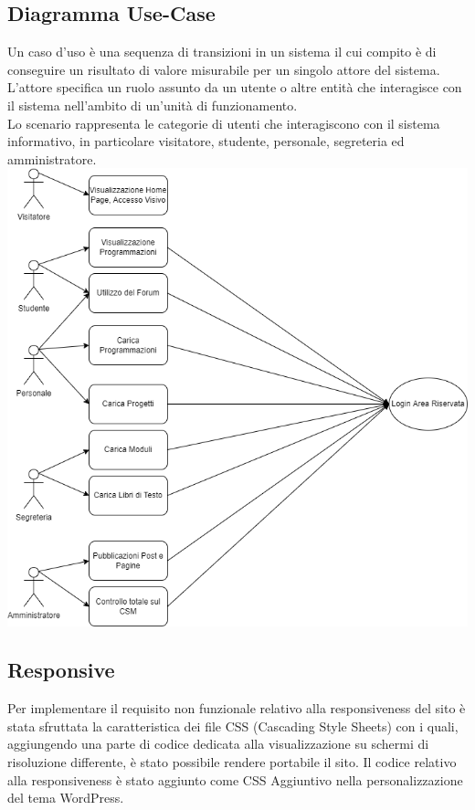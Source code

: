 \documentclass{article}
\begin{document}
	\subsection{\textbf{Diagramma Use-Case}}

	Un caso d’uso è una sequenza di transizioni in un sistema il cui compito è di conseguire un risultato di valore misurabile per un singolo attore del sistema.\\
    L’attore specifica un ruolo assunto da un utente o altre entità che interagisce con il sistema nell’ambito di un’unità di funzionamento.\\
    Lo scenario rappresenta le categorie di utenti che interagiscono con il sistema informativo, in particolare visitatore, studente, personale, segreteria ed amministratore.\\
	\includegraphics[scale=0.4]{usecase.drawio.png}\\
		
	\subsection{\textbf{Responsive}}

	Per implementare il requisito non funzionale relativo alla responsiveness del sito è stata sfruttata la caratteristica dei file CSS (Cascading Style Sheets) con i quali, aggiungendo una parte di codice dedicata alla visualizzazione su schermi di risoluzione differente, è stato possibile rendere portabile il sito. Il codice relativo alla responsiveness è stato aggiunto come CSS Aggiuntivo nella personalizzazione del tema WordPress.
	
\end{document}
